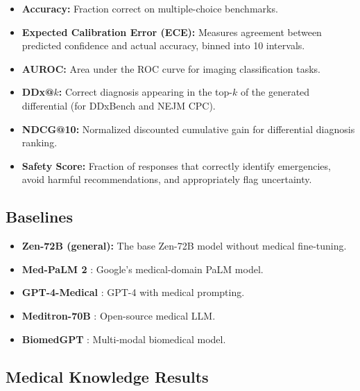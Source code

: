 \documentclass[11pt,a4paper]{article}
\begin{document}
\begin{itemize}
    \item \textbf{Accuracy:} Fraction correct on multiple-choice benchmarks.
    \item \textbf{Expected Calibration Error (ECE):} Measures agreement between predicted confidence and actual accuracy, binned into 10 intervals.
    \item \textbf{AUROC:} Area under the ROC curve for imaging classification tasks.
    \item \textbf{DDx@$k$:} Correct diagnosis appearing in the top-$k$ of the generated differential (for DDxBench and NEJM CPC).
    \item \textbf{NDCG@10:} Normalized discounted cumulative gain for differential diagnosis ranking.
    \item \textbf{Safety Score:} Fraction of responses that correctly identify emergencies, avoid harmful recommendations, and appropriately flag uncertainty.
\end{itemize}

\subsection{Baselines}

\begin{itemize}
    \item \textbf{Zen-72B (general):} The base Zen-72B model without medical fine-tuning.
    \item \textbf{Med-PaLM 2} \citep{singhal2023towards}: Google's medical-domain PaLM model.
    \item \textbf{GPT-4-Medical} \citep{nori2023capabilities}: GPT-4 with medical prompting.
    \item \textbf{Meditron-70B} \citep{chen2023meditron}: Open-source medical LLM.
    \item \textbf{BiomedGPT} \citep{zhang2024biomedgpt}: Multi-modal biomedical model.
\end{itemize}

\subsection{Medical Knowledge Results}
\end{document}

